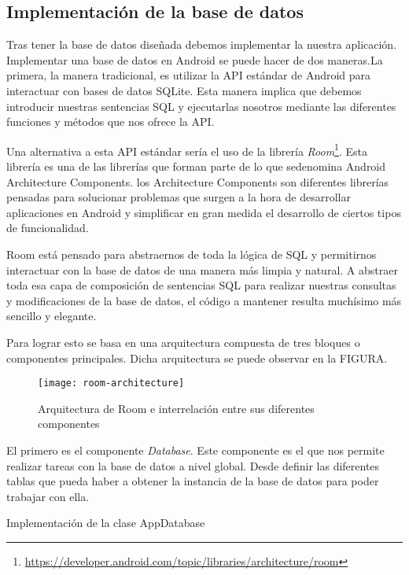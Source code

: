 \subsection{Implementación de la base de datos}

Tras tener la base de datos diseñada debemos implementar la nuestra aplicación. Implementar una base de datos en Android se puede hacer de dos maneras.La primera, la manera tradicional, es utilizar la API estándar de Android para interactuar con bases de datos SQLite. Esta manera implica que debemos introducir nuestras sentencias SQL y ejecutarlas nosotros mediante las diferentes funciones y métodos que nos ofrece la API.

Una alternativa a esta API estándar sería el uso de la librería \textit{Room}\footnote{\url{https://developer.android.com/topic/libraries/architecture/room}}. Esta librería es una de las librerías que forman parte de lo que sedenomina Android Architecture Components. los Architecture Components son diferentes librerías pensadas para solucionar problemas que surgen a la hora de desarrollar aplicaciones en Android y simplificar en gran medida el desarrollo de ciertos tipos de funcionalidad.

Room está pensado para abstraernos de toda la lógica de SQL y permitirnos interactuar con la base de datos de una manera más limpia y natural. A abstraer toda esa capa de composición de sentencias SQL para realizar nuestras consultas y modificaciones de la base de datos, el código a mantener resulta muchísimo más sencillo y elegante.

Para lograr esto se basa en una arquitectura compuesta de tres bloques o componentes principales. Dicha arquitectura se puede observar en la FIGURA.

\begin{figure}[H]
	\centering
	\texttt{[image: room-architecture]}
	\caption{Arquitectura de Room e interrelación entre sus diferentes componentes}
	\label{fig:room-architecture}
\end{figure}

El primero es el componente \textit{Database}. Este componente es el que nos permite realizar tareas con la base de datos a nivel global. Desde definir las diferentes tablas que pueda haber a obtener la instancia de la base de datos para poder trabajar con ella.

\begin{listing}[H]
	\caption{Implementación de la clase AppDatabase}
	
	\label{code:roomDatabase}
\end{listing}

